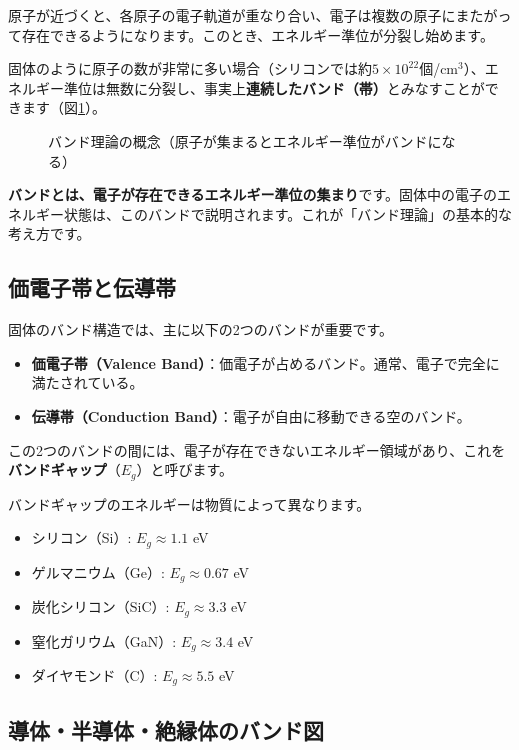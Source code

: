 原子が近づくと、各原子の電子軌道が重なり合い、電子は複数の原子にまたがって存在できるようになります。このとき、エネルギー準位が分裂し始めます。

固体のように原子の数が非常に多い場合（シリコンでは約$5 \times 10^{22}$個/cm$^3$）、エネルギー準位は無数に分裂し、事実上\textbf{連続したバンド（帯）}とみなすことができます（図\ref{fig:band_concept}）。

\begin{figure}[H]
\centering
{}
\caption{バンド理論の概念（原子が集まるとエネルギー準位がバンドになる）}
\label{fig:band_concept}
\end{figure}

\textbf{バンドとは、電子が存在できるエネルギー準位の集まり}です。固体中の電子のエネルギー状態は、このバンドで説明されます。これが「バンド理論」の基本的な考え方です。

\subsection{価電子帯と伝導帯}

固体のバンド構造では、主に以下の2つのバンドが重要です。

\begin{itemize}
\item \textbf{価電子帯（Valence Band）}：価電子が占めるバンド。通常、電子で完全に満たされている。
\item \textbf{伝導帯（Conduction Band）}：電子が自由に移動できる空のバンド。
\end{itemize}

この2つのバンドの間には、電子が存在できないエネルギー領域があり、これを\textbf{バンドギャップ}（$E_g$）と呼びます。

バンドギャップのエネルギーは物質によって異なります。
\begin{itemize}
\item シリコン（Si）: $E_g \approx 1.1$ eV
\item ゲルマニウム（Ge）: $E_g \approx 0.67$ eV
\item 炭化シリコン（SiC）: $E_g \approx 3.3$ eV
\item 窒化ガリウム（GaN）: $E_g \approx 3.4$ eV
\item ダイヤモンド（C）: $E_g \approx 5.5$ eV
\end{itemize}

\subsection{導体・半導体・絶縁体のバンド図}

